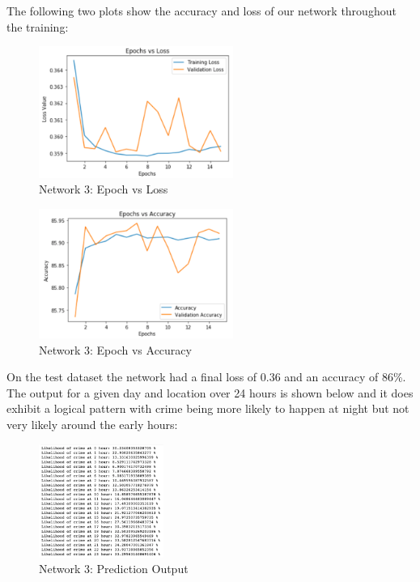 \documentclass[conference]{IEEEtran}
\begin{document}
The following two plots show the accuracy and loss of our network throughout the training:

\begin{figure}[H]
  \centering
  \captionsetup{justification=centering}
  \centering
  \includegraphics[width=2.5in]{16.png}
  \caption{Network 3: Epoch vs Loss}  
  \label{1}
\end{figure}

\begin{figure}[H]
  \centering
  \captionsetup{justification=centering}
  \centering
  \includegraphics[width=2.5in]{17.png}
  \caption{Network 3: Epoch vs Accuracy}  
  \label{1}
\end{figure}

On the test dataset the network had a final loss of 0.36 and an accuracy of 86\%. The output for a given day and location over 24 hours is
shown below and it does exhibit a logical pattern with crime being more likely to happen at night but not very likely around the early hours:

\begin{figure}[H]
  \centering
  \captionsetup{justification=centering}
  \centering
  \includegraphics[width=1.6in]{18.png}
  \caption{Network 3: Prediction Output}  
  \label{1}
\end{figure}
\end{document}
